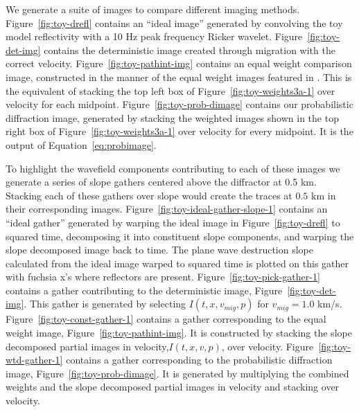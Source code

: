 We generate a suite of images to compare different imaging methods. Figure~\ref{fig:toy-drefl} contains an ``ideal image'' generated by convolving the toy model reflectivity with a 10 Hz peak frequency Ricker wavelet. Figure~\ref{fig:toy-det-img} contains the deterministic image created through migration with the correct velocity.     Figure~\ref{fig:toy-pathint-img} contains an equal weight  comparison image, constructed in the manner of the equal weight images featured in \cite{merzlikin2017}.  This is the equivalent of stacking the top left box of Figure~\ref{fig:toy-weights3a-1} over velocity for each midpoint. Figure~\ref{fig:toy-prob-dimage} contains our probabilistic diffraction image, generated by stacking the weighted images shown in the top right box of Figure~\ref{fig:toy-weights3a-1} over velocity for every midpoint.  It is the output of Equation~\ref{eq:probimage}.  

To highlight the wavefield components contributing to each of these images we generate a series of slope gathers centered above the diffractor at 0.5 km.  Stacking each of these gathers over slope would create the traces at $0.5$ km in their corresponding images.  Figure~\ref{fig:toy-ideal-gather-slope-1} contains an ``ideal gather'' generated by warping the ideal image in Figure~\ref{fig:toy-drefl} to squared time, decomposing it into constituent slope components, and warping the slope decomposed image back to time. The plane wave destruction slope calculated from the ideal image warped to squared time  is plotted on this gather with fuchsia x's where reflectors are present.  Figure~\ref{fig:toy-pick-gather-1} contains a gather contributing to the deterministic image, Figure~\ref{fig:toy-det-img}. This gather is generated by selecting $I\left(t,x,v_{mig},p\right)$ for $v_{mig} = 1.0$ km/s.  Figure~\ref{fig:toy-const-gather-1} contains a gather corresponding to the equal weight image, Figure~\ref{fig:toy-pathint-img}.  It is constructed by stacking the slope decomposed partial images in velocity,$I\left(t,x,v,p\right)$, over velocity.  Figure~\ref{fig:toy-wtd-gather-1} contains a gather corresponding to the probabilistic diffraction image, Figure~\ref{fig:toy-prob-dimage}.  It is generated by multiplying the combined weights and the slope decomposed partial images in velocity and stacking over velocity.



